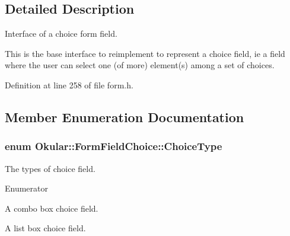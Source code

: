 \subsection{Detailed Description}
Interface of a choice form field. 

This is the base interface to reimplement to represent a choice field, ie a field where the user can select one (of more) element(s) among a set of choices. 

Definition at line 258 of file form.\+h.



\subsection{Member Enumeration Documentation}
\hypertarget{classOkular_1_1FormFieldChoice_a40b3939793e805c34303dff8262a17b3}{
\subsubsection[{Choice\+Type}]{\setlength{\rightskip}{0pt plus 5cm}enum {\bf Okular\+::\+Form\+Field\+Choice\+::\+Choice\+Type}}}\label{classOkular_1_1FormFieldChoice_a40b3939793e805c34303dff8262a17b3}
The types of choice field. \begin{Desc}
\item[Enumerator]\par
\begin{description}
\item[{\em 
\hypertarget{classOkular_1_1FormFieldChoice_a40b3939793e805c34303dff8262a17b3a0b28a631de109efed14e9183a83a0855}{Combo\+Box}\label{classOkular_1_1FormFieldChoice_a40b3939793e805c34303dff8262a17b3a0b28a631de109efed14e9183a83a0855}
}]A combo box choice field. \item[{\em 
\hypertarget{classOkular_1_1FormFieldChoice_a40b3939793e805c34303dff8262a17b3acc508b1d796fa6a7da5043fdbf6c7d2a}{List\+Box}\label{classOkular_1_1FormFieldChoice_a40b3939793e805c34303dff8262a17b3acc508b1d796fa6a7da5043fdbf6c7d2a}
}]A list box choice field. \end{description}
\end{Desc}


